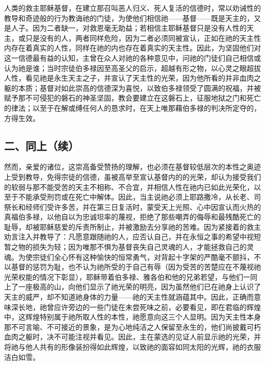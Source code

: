 人类的救主耶稣基督，在建立那召叫恶人归义、死人复活的信德时，常以劝诫性的教导和奇迹般的行为教诲祂的门徒，为使他们相信祂——基督——既是天主的，又是人子。因为二者缺一，对救恩毫无助益；若相信主耶稣基督只是没有人性的天主，或只是没有的人，两者同样危险，因为二者必须同被宣认，正如在祂的天主性内存在着真实的人性，同样在祂的内也存在着真实的天主性。因此，为坚固他们对这一信德最有益的认知，主曾在众人对祂的各种意见中，问祂的门徒们自己相信或认为祂是谁；当时宗徒伯多禄因至高圣父的启示，超越有形之物，以心灵之眼超拔人性，看见祂是永生天主之子，并宣认了天主性的光荣，因为他所看的并非血肉之躯的本质；基督对如此崇高的信德深为喜悦，以致伯多禄领受了圆满的祝福，并被赋予那不可侵犯的磐石的神圣坚固，教会要建立在这磐石上，征服地狱之门和死亡的律法；以至于在解或缚任何人的恳求时，在天上唯那藉伯多禄的判决所定夺的，方得生效。\par


\subsection{二、同上（续）}

然而，亲爱的诸位，这崇高备受赞扬的理解，也必须在基督较低层次的本性之奥迹上受到教导，免得宗徒的信德，虽被高举至宣认基督内的的光荣，却认为接受我们的软弱与那不能受苦的天主不相称、不合宜，并相信人性在祂内已如此光荣化，以至于不能承受刑罚或在死亡中解体。因此，当主说祂必须上耶路撒冷，从长老、司祭长和经师们受许多苦，并在第三日复活时，蒙受天上光照、心中因宣认而火热的真福伯多禄，以他自以为忠诚坦率的蔑视，拒绝了那些嘲弄的侮辱和最残酷死亡的耻辱，却被耶稣慈爱的斥责所制止，并被激励去分享祂的苦难。因为紧接着的救主劝言注入并教导了：凡愿意跟随祂的人，应否认自己，并在永恒之事的希望中视短暂之物的损失为轻；因为唯那不惧为基督丧失自己灵魂的人，才能拯救自己的灵魂。为使宗徒们全心怀有这种愉快的恒常勇气，对背起十字架的严酷毫不颤抖，不以基督的惩罚为耻，也不认为祂所受的于自己有辱（因为受苦的苦楚应在不蔑视祂光荣权能的情况下彰显），耶稣带着伯多禄、雅各伯和他的兄弟若望，与他们一同上了一座极高的山，向他们显示了祂光荣的明亮，因为虽然他们已在祂身上认识了天主的威严，却不知道祂身体的力量——祂的天主性就涵蕴其中。因此，正确而意味深长地，祂曾应许旁边的一些门徒在未尝死味之前，必要看见，即在君临的辉煌中，这辉煌特别属于祂所取人性的本性，祂愿意向这三个人显明。因为天主性本身那不可言喻、不可接近的景象，是为心地纯洁之人保留至永生的，他们尚披戴可朽血肉之躯时，决不可能注视并看见。因此，主在蒙选的见证人前显示祂的光荣，并将祂与他人共有的形像装扮得如此辉煌，以致祂的面容如同太阳的光辉，祂的衣服洁白如雪。\par

